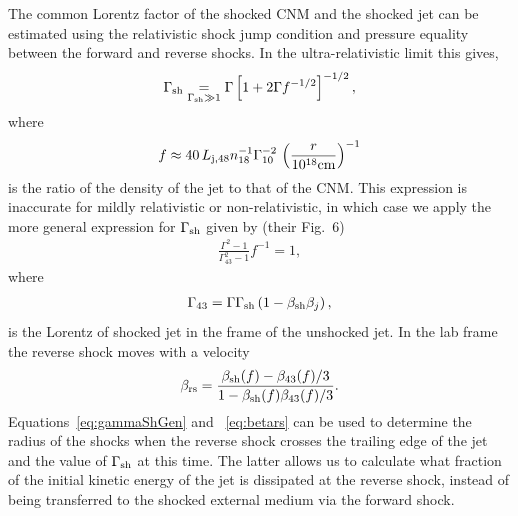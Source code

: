 \documentclass[usenatbib,fleqn]{mnras}
\newcommand       \be          {\begin{eqnarray}}
\newcommand       \ee          {\end{eqnarray}}
\begin{document}
The common Lorentz factor of the shocked CNM and the shocked jet can be estimated using the relativistic shock jump condition and pressure equality between the forward and reverse shocks.  In the ultra-relativistic limit this gives,
\begin{equation}
\Gamma_{\rm sh} \underset{\Gamma_{\rm sh} \gg 1}= \Gamma\left[1 + 2\Gamma f^{-1/2}\right]^{-1/2},
\end{equation}
where
\begin{equation}
  f\approx 40\,  L_{\rm j,48} n_{18}^{-1} \Gamma_{10}^{-2} \, \left(\frac{r}{10^{18} {\rm
        cm}}\right)^{-1} 
\end{equation}
is the ratio of the density of the jet to that of the CNM.  This expression is inaccurate for mildly relativistic or non-relativistic, in which case we apply the more general expression for $\Gamma_{\rm sh}$ given by 
\citet{Beloborodov&Uhm2006} (their Fig.~6)
\be
\frac{\Gamma^2-1}{\Gamma_{43}^2-1} f^{-1}=1 ,
\ee
where
\be
\Gamma_{43}=\Gamma \Gamma_{\rm sh} \left(1-\beta_{\rm sh} \beta_j\right),
\label{eq:gammaShGen}
\ee
is the Lorentz of shocked jet in the frame of the unshocked jet. In the lab frame the reverse shock moves with a velocity
\begin{equation}
\beta_{\rm rs}=\frac{\beta_{\rm sh}(f)-\beta_{43}(f)/3}{1-\beta_{\rm
    sh}(f) \beta_{43}(f)/3}.
\label{eq:betars}
\end{equation} 
%
Equations~\eqref{eq:gammaShGen} and ~\eqref{eq:betars} can be used to
determine the radius of the shocks when the reverse shock crosses the
trailing edge of the jet and the value of $\Gamma_{\rm sh}$ at this
time.  The latter allows us to calculate what fraction of the initial
kinetic energy of the jet is dissipated at the reverse shock, instead
of being transferred to the shocked external medium via the forward
shock.



\clearpage
  \footnotesize{
    
    
  }
\end{document}
